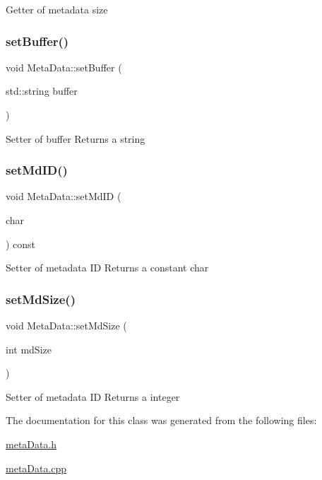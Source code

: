 Getter of metadata size \mbox{\label{classMetaData_a8993ecf3ca590b956fd1c7383a3f5c24}} 
\subsubsection{\texorpdfstring{set\+Buffer()}{setBuffer()}}
{\footnotesize\ttfamily void Meta\+Data\+::set\+Buffer (\begin{DoxyParamCaption}\item[{std\+::string}]{buffer }\end{DoxyParamCaption})}

Setter of buffer Returns a string \mbox{\label{classMetaData_ad16be865033e4856cf1eaab2dd6e5409}} 
\subsubsection{\texorpdfstring{set\+Md\+I\+D()}{setMdID()}}
{\footnotesize\ttfamily void Meta\+Data\+::set\+Md\+ID (\begin{DoxyParamCaption}\item[{char}]{ }\end{DoxyParamCaption}) const}

Setter of metadata ID Returns a constant char \mbox{\label{classMetaData_aa500b5bcfc28dfc1f0b32b7fcdca108f}} 
\subsubsection{\texorpdfstring{set\+Md\+Size()}{setMdSize()}}
{\footnotesize\ttfamily void Meta\+Data\+::set\+Md\+Size (\begin{DoxyParamCaption}\item[{int}]{md\+Size }\end{DoxyParamCaption})}

Setter of metadata ID Returns a integer 

The documentation for this class was generated from the following files\+:\begin{DoxyCompactItemize}
\item 
\hyperlink{metaData_8h}{meta\+Data.\+h}\item 
\hyperlink{metaData_8cpp}{meta\+Data.\+cpp}\end{DoxyCompactItemize}
